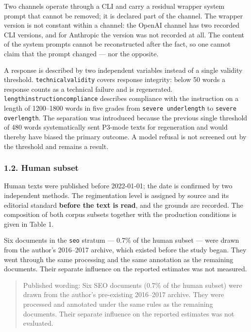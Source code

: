 \documentclass[11pt,a4paper]{article}
\renewcommand{\_}{\textunderscore\allowbreak}
\begin{document}
Two channels operate through a CLI and carry a residual wrapper system prompt that
cannot be removed; it is declared part of the channel. The wrapper version is not
constant within a channel: the OpenAI channel has two recorded CLI versions, and
for Anthropic the version was not recorded at all. The content of the system
prompts cannot be reconstructed after the fact, so one cannot claim that the
prompt changed — nor the opposite.

A response is described by two independent variables instead of a single validity
threshold. \texttt{technical\_validity} covers response integrity: below 50 words a
response counts as a technical failure and is regenerated.
\texttt{length\_instruction\_compliance} describes compliance with the instruction on a
length of 1200–1800 words in five grades from \texttt{severe underlength} to \texttt{severe
overlength}. The separation was introduced because the previous single threshold
of 480 words systematically sent P3-mode texts for regeneration and would thereby
have biased the primary outcome. A model refusal is not screened out by the
threshold and remains a result.

\subsubsection{1.2. Human subset}

Human texts were published before 2022-01-01; the date is confirmed by two
independent methods. The regimentation level is assigned by source and its
editorial standard \textbf{before the text is read}, and the grounds are recorded. The
composition of both corpus subsets together with the production conditions is
given in Table 1.

\setcounter{table}{0}


Six documents in the \texttt{seo} stratum — 0.7\% of the human subset — were drawn from
the author's 2016–2017 archive, which existed before the study began. They went
through the same processing and the same annotation as the remaining documents.
Their separate influence on the reported estimates was not measured.

\begin{quote}
Published wording: Six SEO documents (0.7\% of the human subset) were drawn
from the author's pre-existing 2016–2017 archive. They were processed and
annotated under the same rules as the remaining documents. Their separate
influence on the reported estimates was not evaluated.
\end{quote}
\end{document}
